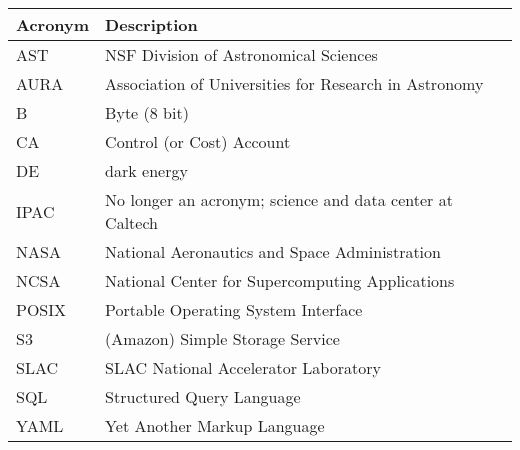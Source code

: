\addtocounter{table}{-1}
\begin{longtable}{p{}p{}}\hline
\textbf{Acronym} & \textbf{Description}  \\\hline

AST & NSF Division of Astronomical Sciences \\\hline
AURA & Association of Universities for Research in Astronomy \\\hline
B & Byte (8 bit) \\\hline
CA & Control (or Cost) Account \\\hline
DE & dark energy \\\hline
IPAC & No longer an acronym; science and data center at Caltech \\\hline
NASA & National Aeronautics and Space Administration \\\hline
NCSA & National Center for Supercomputing Applications \\\hline
POSIX & Portable Operating System Interface \\\hline
S3 & (Amazon) Simple Storage Service  \\\hline
SLAC & SLAC National Accelerator Laboratory \\\hline
SQL & Structured Query Language \\\hline
YAML & Yet Another Markup Language \\\hline
\end{longtable}
